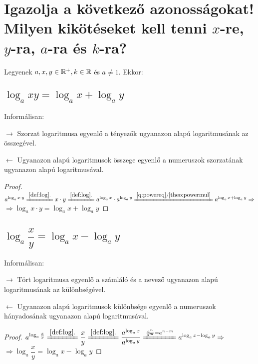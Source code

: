 
\section{Igazolja a következő azonosságokat! Milyen kikötéseket kell tenni
\texorpdfstring{$x$}{x}-re, \texorpdfstring{$y$}{y}-ra,
\texorpdfstring{$a$}{a}-ra és \texorpdfstring{$k$}{k}-ra?}
\label{017}

Legyenek $a, x, y \in \mathbb{R}^+, k \in \mathbb{R}$ és $a \neq 1$. Ekkor:

\subsection{
\texorpdfstring
  {$\log_{a}xy = \log_{a}x + \log_{a}y$}
  {log\textunderscore{}a(xy) = log\textunderscore{}a(x) 
    + log\textunderscore{}a(y)}
}

Informálisan:

$\rightarrow$ Szorzat logaritmusa egyenlő a tényezők ugyanazon alapú
logaritmusának az összegével.

$\leftarrow$ Ugyanazon alapú logaritmusok összege egyenlő a numeruszok
szorzatának ugyanazon alapú logaritmusával.

\begin{proof}
$
  a^{\log_{a}x\cdot y} 
    \xlongequal{\ref{def:log}.} 
  x \cdot y
    \xlongequal{\ref{def:log}.}
  a^{\log_{a}x} \cdot a^{\log_{a}y}
    \xlongequal{\ref{q:powereq}/\ref{theo:powermul}}
  a^{\log_{a}x + \log_{a} y}
    \Rightarrow$\\$\Rightarrow
  \log_{a}x \cdot y = \log_{a}x + \log_{a}y
$
\end{proof}

\subsection{
\texorpdfstring
  {$\log_{a}\dfrac{x}{y} = \log_{a}x - \log_{a}y$}
  {log\textunderscore{}a(x/y) = log\textunderscore{}a(x) -
    - log\textunderscore{}a(y)}
}

Informálisan:

$\rightarrow$ Tört logaritmusa egyenlő a számláló és a nevező ugyanazon alapú
logaritmusának az különbségével.

$\leftarrow$ Ugyanazon alapú logaritmusok különbsége egyenlő a numeruszok
hányadosának ugyanazon alapú logaritmusával.

\begin{proof}
$
  a^{\log_{a}\frac{x}{y}}
    \xlongequal{\ref{def:log}.}
  \dfrac{x}{y}
    \xlongequal{\ref{def:log}.}
  \dfrac{a^{\log_{a}x}}{a^{\log_{a}y}}
    \xlongequal{\frac{a^n}{a^m} = a^{n-m}}
  a^{\log_{a}x - \log_{a} y}
    \Rightarrow$\\$\Rightarrow 
  \log_{a}\dfrac{x}{y} = \log_{a}x - \log_{a}y
$
\end{proof}	

